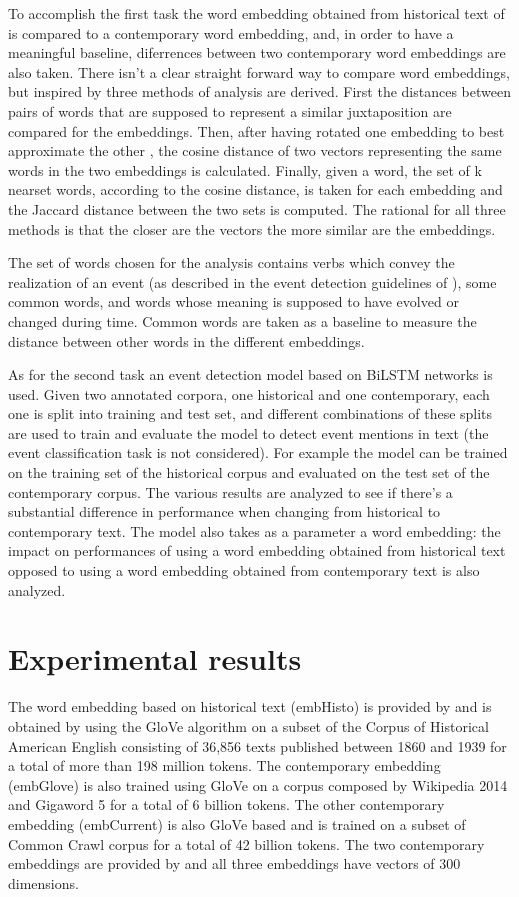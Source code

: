 \documentclass[runningheads]{llncs}
\begin{document}
To accomplish the first task the word embedding obtained from historical text of \cite{histo} is compared to a contemporary word embedding, and, in order to have a meaningful baseline, diferrences between two contemporary word embeddings are also taken. There isn't a clear straight forward way to compare word embeddings, but inspired by \cite{embcomp} three methods of analysis are derived. First the distances between pairs of words that are supposed to represent a similar juxtaposition are compared for the embeddings. Then, after having rotated one embedding to best approximate the other \cite{rotation}, the cosine distance of two vectors representing the same words in the two embeddings is calculated. Finally, given a word, the set of k nearset words, according to the cosine distance, is taken for each embedding and the Jaccard distance between the two sets is computed. The rational for all three methods is that the closer are the vectors the more similar are the embeddings.

The set of words chosen for the analysis contains verbs which convey the realization of an event (as described in the event detection guidelines of \cite{histo}), some common words, and words whose meaning is supposed to have evolved or changed during time. Common words are taken as a baseline to measure the distance between other words in the different embeddings.

As for the second task an event detection model based on BiLSTM networks \cite{bilstm} is used. Given two annotated corpora, one historical and one contemporary, each one is split into training and test set, and different combinations of these splits are used to train and evaluate the model to detect event mentions in text (the event classification task is not considered). For example the model can be trained on the training set of the historical corpus and evaluated on the test set of the contemporary corpus. The various results are analyzed to see if there's a substantial difference in performance when changing from historical to contemporary text. The model also takes as a parameter a word embedding: the impact on performances of using a word embedding obtained from historical text opposed to using a word embedding obtained from contemporary text is also analyzed.

\section{Experimental results}

The word embedding based on historical text (embHisto) is provided by \cite{histo} and is obtained by using the GloVe algorithm on a subset of the Corpus of Historical American English consisting of 36,856 texts published between 1860 and 1939 for a total of more than 198 million tokens. The contemporary embedding (embGlove) is also trained using GloVe on a corpus composed by Wikipedia 2014 and Gigaword 5 for a total of 6 billion tokens. The other contemporary embedding (embCurrent) is also GloVe based and is trained on a subset of Common Crawl corpus for a total of 42 billion tokens. The two contemporary embeddings are provided by \cite{glove} and all three embeddings have vectors of 300 dimensions.
\end{document}

